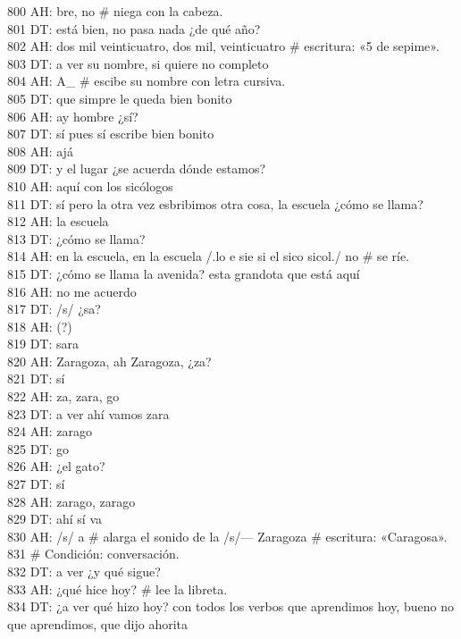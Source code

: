 800 AH: bre, no \# niega con la cabeza.\\
801 DT: está bien, no pasa nada ¿de qué año?\\
802 AH: dos mil veinticuatro, dos mil, veinticuatro \# escritura: «5 de sepime».\\
803 DT: a ver su nombre, si quiere no completo\\
804 AH: A\_ \# escibe su nombre con letra cursiva.\\
805 DT: que simpre le queda bien bonito\\
806 AH: ay hombre ¿sí?\\
807 DT: sí pues sí escribe bien bonito\\
808 AH: ajá\\
809 DT: y el lugar ¿se acuerda dónde estamos?\\
810 AH: aquí con los sicólogos\\
811 DT: sí pero la otra vez esbribimos otra cosa, la escuela ¿cómo se llama?\\
812 AH: la escuela\\
813 DT: ¿cómo se llama?\\
814 AH: en la escuela, en la escuela /.lo e sie si el sico sicol./ no \# se ríe.\\
815 DT: ¿cómo se llama la avenida? esta grandota que está aquí\\
816 AH: no me acuerdo\\
817 DT: /s/ ¿sa?\\
818 AH: (?)\\
819 DT: sara\\
820 AH: Zaragoza, ah Zaragoza, ¿za?\\
821 DT: sí\\
822 AH: za, zara, go\\
823 DT: a ver ahí vamos zara\\
824 AH: zarago\\
825 DT: go\\
826 AH: ¿el gato?\\
827 DT: sí\\
828 AH: zarago, zarago\\
829 DT: ahí sí va\\
830 AH: /s/ a \# alarga el sonido de la /s/--- Zaragoza \# escritura: «Caragosa».\\
831 \# Condición: conversación.\\
832 DT: a ver ¿y qué sigue?\\
833 AH: ¿qué hice hoy? \# lee la libreta.\\
834 DT: ¿a ver qué hizo hoy? con todos los verbos que aprendimos hoy, bueno no que aprendimos, que dijo ahorita\\
